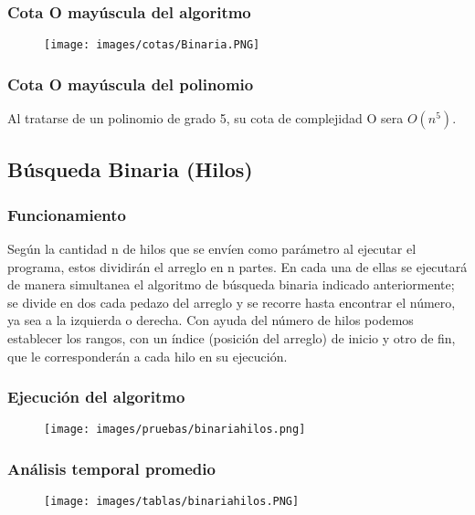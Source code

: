 \documentclass[12pt]{article}
\begin{document}
			\subsubsection{Cota O mayúscula del algoritmo}

		    	\begin{figure}[H]
			    	   \centering
			    	   \texttt{[image: images/cotas/Binaria.PNG]}
			    \end{figure}
			    
			    \subsubsection{Cota O mayúscula del polinomio}
			    Al tratarse de un polinomio de grado 5, su cota de complejidad O sera $O(n^5)$.
				
\newpage

		\subsection{Búsqueda Binaria (Hilos)}
			
			\subsubsection{Funcionamiento}
			Según la cantidad n de hilos que se envíen como parámetro al ejecutar el programa, estos dividirán el arreglo en n partes. En cada una de ellas se ejecutará de manera simultanea el algoritmo de búsqueda binaria indicado anteriormente; se divide en dos cada pedazo del arreglo y se recorre hasta encontrar el número, ya sea a la izquierda o derecha. Con ayuda del número de hilos podemos establecer los rangos, con un índice (posición del arreglo) de inicio y otro de fin, que le corresponderán a cada hilo en su ejecución.
			
			\subsubsection{Ejecución del algoritmo}
				\begin{figure}[H]
			    	   \centering
			    	   \texttt{[image: images/pruebas/binariahilos.png]}
			    \end{figure}
			
			\subsubsection{Análisis temporal promedio}
				\begin{figure}[H]
			    	   \centering
			    	   \texttt{[image: images/tablas/binariahilos.PNG]}
			    \end{figure}
			
\end{document}

